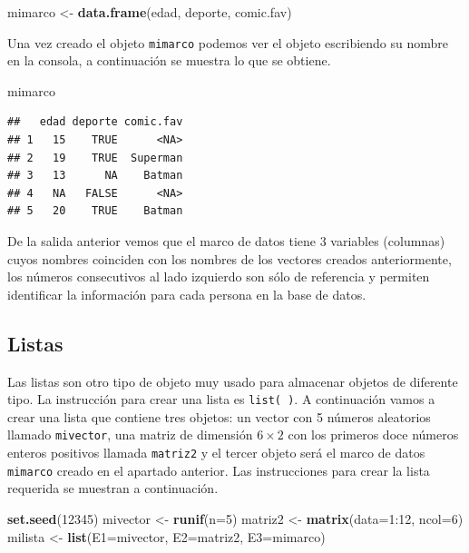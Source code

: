 \documentclass[10pt,]{krantz}
\makeatletter
\newenvironment{Shaded}{\begin{snugshade}}{\end{snugshade}}
\newcommand{\KeywordTok}[1]{\textcolor[rgb]{0.13,0.29,0.53}{\textbf{{#1}}}}
\newcommand{\DataTypeTok}[1]{\textcolor[rgb]{0.13,0.29,0.53}{{#1}}}
\newcommand{\DecValTok}[1]{\textcolor[rgb]{0.00,0.00,0.81}{{#1}}}
\newcommand{\StringTok}[1]{\textcolor[rgb]{0.31,0.60,0.02}{{#1}}}
\newcommand{\NormalTok}[1]{{#1}}
\newenvironment{kframe}{%
\medskip{}
\setlength{\fboxsep}{.8em}
 \def\at@end@of@kframe{}%
 \ifinner\ifhmode%
  \def\at@end@of@kframe{\end{minipage}}%
  \begin{minipage}{\columnwidth}%
 \fi\fi%
 \def\FrameCommand##1{\hskip\@totalleftmargin \hskip-\fboxsep
 \colorbox{shadecolor}{##1}\hskip-\fboxsep
     \hskip-\linewidth \hskip-\@totalleftmargin \hskip\columnwidth}%
 \MakeFramed {\advance\hsize-\width
   \@totalleftmargin\z@ \linewidth\hsize
   \@setminipage}}%
 {\par\unskip\endMakeFramed%
 \at@end@of@kframe}
\renewenvironment{Shaded}{\begin{kframe}}{\end{kframe}}
\makeatother
\begin{document}
\begin{Shaded}
\begin{Highlighting}[]
\NormalTok{mimarco <-}\StringTok{ }\KeywordTok{data.frame}\NormalTok{(edad, deporte, comic.fav)}
\end{Highlighting}
\end{Shaded}

Una vez creado el objeto \texttt{mimarco} podemos ver el objeto
escribiendo su nombre en la consola, a continuación se muestra lo que se
obtiene.

\begin{Shaded}
\begin{Highlighting}[]
\NormalTok{mimarco}
\end{Highlighting}
\end{Shaded}

\begin{verbatim}
##   edad deporte comic.fav
## 1   15    TRUE      <NA>
## 2   19    TRUE  Superman
## 3   13      NA    Batman
## 4   NA   FALSE      <NA>
## 5   20    TRUE    Batman
\end{verbatim}

De la salida anterior vemos que el marco de datos tiene 3 variables
(columnas) cuyos nombres coinciden con los nombres de los vectores
creados anteriormente, los números consecutivos al lado izquierdo son
sólo de referencia y permiten identificar la información para cada
persona en la base de datos.

\subsection{Listas}

Las listas  son otro tipo de objeto muy usado para
almacenar objetos de diferente tipo. La instrucción para crear una lista
es \texttt{list(\ )}. A continuación vamos a crear una lista que
contiene tres objetos: un vector con 5 números aleatorios llamado
\texttt{mivector}, una matriz de dimensión \(6 \times 2\) con los
primeros doce números enteros positivos llamada \texttt{matriz2} y el
tercer objeto será el marco de datos \texttt{mimarco} creado en el
apartado anterior. Las instrucciones para crear la lista requerida se
muestran a continuación.

\begin{Shaded}
\begin{Highlighting}[]
\KeywordTok{set.seed}\NormalTok{(}\DecValTok{12345}\NormalTok{)}
\NormalTok{mivector <-}\StringTok{ }\KeywordTok{runif}\NormalTok{(}\DataTypeTok{n=}\DecValTok{5}\NormalTok{)}
\NormalTok{matriz2 <-}\StringTok{ }\KeywordTok{matrix}\NormalTok{(}\DataTypeTok{data=}\DecValTok{1}\NormalTok{:}\DecValTok{12}\NormalTok{, }\DataTypeTok{ncol=}\DecValTok{6}\NormalTok{)}
\NormalTok{milista <-}\StringTok{ }\KeywordTok{list}\NormalTok{(}\DataTypeTok{E1=}\NormalTok{mivector, }\DataTypeTok{E2=}\NormalTok{matriz2, }\DataTypeTok{E3=}\NormalTok{mimarco)}
\end{Highlighting}
\end{Shaded}
\end{document}
